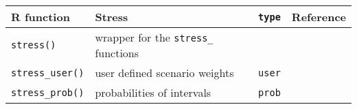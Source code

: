 \documentclass[]{article}
\theoremstyle{definition}
\theoremstyle{definition}
\theoremstyle{definition}
\theoremstyle{remark}
\begin{document}
\begin{longtable}[]{@{}llll@{}}
\toprule
\begin{minipage}[b]{0.22\columnwidth}\raggedright
R function\strut
\end{minipage} & \begin{minipage}[b]{0.38\columnwidth}\raggedright
Stress\strut
\end{minipage} & \begin{minipage}[b]{0.09\columnwidth}\raggedright
\texttt{type}\strut
\end{minipage} & \begin{minipage}[b]{0.19\columnwidth}\raggedright
Reference\strut
\end{minipage}\tabularnewline
\midrule
\endhead
\begin{minipage}[t]{0.22\columnwidth}\raggedright
\texttt{stress()}\strut
\end{minipage} & \begin{minipage}[t]{0.38\columnwidth}\raggedright
wrapper for the \texttt{stress\_} functions\strut
\end{minipage} & \begin{minipage}[t]{0.09\columnwidth}\raggedright
\strut
\end{minipage} & \begin{minipage}[t]{0.19\columnwidth}\raggedright
\strut
\end{minipage}\tabularnewline
\begin{minipage}[t]{0.22\columnwidth}\raggedright
\texttt{stress\_user()}\strut
\end{minipage} & \begin{minipage}[t]{0.38\columnwidth}\raggedright
user defined scenario weights\strut
\end{minipage} & \begin{minipage}[t]{0.09\columnwidth}\raggedright
\texttt{user}\strut
\end{minipage} & \begin{minipage}[t]{0.19\columnwidth}\raggedright
\strut
\end{minipage}\tabularnewline
\begin{minipage}[t]{0.22\columnwidth}\raggedright
\texttt{stress\_prob()}\strut
\end{minipage} & \begin{minipage}[t]{0.38\columnwidth}\raggedright
probabilities of intervals\strut
\end{minipage} & \begin{minipage}[t]{0.09\columnwidth}\raggedright
\texttt{prob}\strut

\end{minipage}
\end{longtable}
\end{document}
